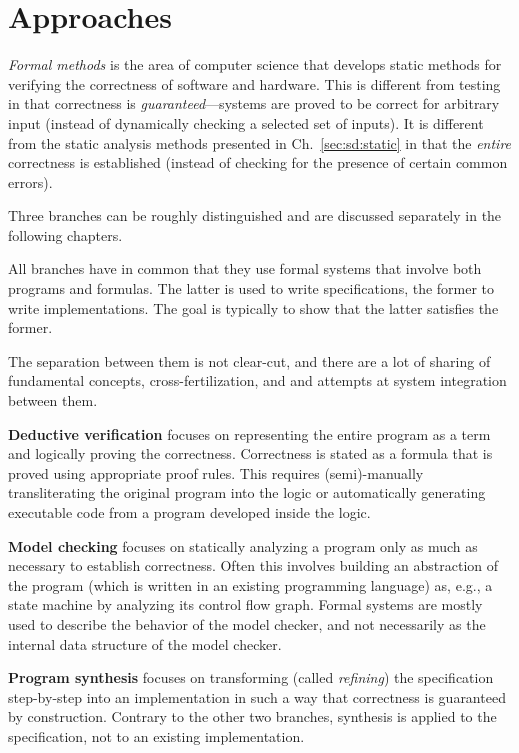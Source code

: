 \section{Approaches}

\emph{Formal methods} is the area of computer science that develops static methods for verifying the correctness of software and hardware.
This is different from testing in that correctness is \emph{guaranteed}---systems are proved to be correct for arbitrary input (instead of dynamically checking a selected set of inputs).
It is different from the static analysis methods presented in Ch.~\ref{sec:sd:static} in that the \emph{entire} correctness is established (instead of checking for the presence of certain common errors).

Three branches can be roughly distinguished and are discussed separately in the following chapters.

All branches have in common that they use formal systems that involve both programs and formulas.
The latter is used to write specifications, the former to write implementations.
The goal is typically to show that the latter satisfies the former.

The separation between them is not clear-cut, and there are a lot of sharing of fundamental concepts, cross-fertilization, and and attempts at system integration between them.

\textbf{Deductive verification} focuses on representing the entire program as a term and logically proving the correctness.
Correctness is stated as a formula that is proved using appropriate proof rules.
This requires (semi)-manually transliterating the original program into the logic or automatically generating executable code from a program developed inside the logic.

\textbf{Model checking} focuses on statically analyzing a program only as much as necessary to establish correctness.
Often this involves building an abstraction of the program (which is written in an existing programming language) as, e.g., a state machine by analyzing its control flow graph.
Formal systems are mostly used to describe the behavior of the model checker, and not necessarily as the internal data structure of the model checker.

\textbf{Program synthesis} focuses on transforming (called \emph{refining}) the specification step-by-step into an implementation in such a way that correctness is guaranteed by construction.
Contrary to the other two branches, synthesis is applied to the specification, not to an existing implementation.

